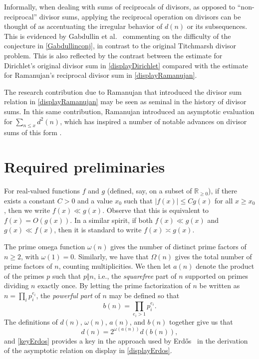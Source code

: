 \documentclass[12pt]{article}
\begin{document}
 Informally, when dealing with sums of reciprocals of divisors, as opposed to ``non-reciprocal'' divisor sums, applying the reciprocal 
 operation on divisors can be thought of as accentuating  the irregular behavior of $d(n)$ or its subsequences.  This is evidenced by 
 Gabdullin et al.\ \cite{GabdullinKonyaginIudelevich2023} commenting on the difficulty of the conjecture in  \eqref{Gabdullinconj}, in  
 contrast to the original  Titchmarsh divisor problem. 
 This is also reflected by the contrast between the estimate for Dirichlet's original divisor sum in 
 \eqref{displayDirichlet} compared with the estimate
 for Ramanujan's reciprocal divisor sum in \eqref{displayRamanujan}. 

 The research contribution due to Ramanujan \cite{Ramanujan1915analytic} that introduced the divisor sum relation in 
 \eqref{displayRamanujan} may be seen as seminal in the history of divisor sums. 
 In this same contribution, Ramanujan introduced
 an asymptotic evaluation for 
 $ \sum_{n \leq x} d^{2}(n)$, 
 which has inspired a number of notable 
 advances on divisor sums of this form \cite{CullyHugillTrudgian2021,JiaSankaranarayanan2014,MaierSankaranarayanan2005,RamachandraSankaranarayanan2003}. 

\section{Required preliminaries}\label{secprelim}
 For real-valued functions $f$ and $g$ (defined, say, on a subset of $\mathbb{R}_{\geq 0}$), if there exists a constant $C > 0$ and a value 
 $x_0$ such that $ |f(x)| \leq C g(x) $ for all $x \geq x_0$, then we write $f(x) \ll g(x)$. Observe that this is equivalent to $f(x) = O(g(x))$. 
 In a similar spirit, if both $f(x) \ll g(x)$ and $g(x) \ll f(x)$, then it is standard to write $f(x) \asymp g(x)$. 

 The prime omega function $\omega(n)$ gives the number of distinct prime factors of $n \geq 2$, with $\omega(1) = 0$. Similarly, we 
 have that $\Omega(n)$
 gives the total number of prime factors of $n$, counting multiplicities. 
 We then let \(a(n)\) denote the product of the primes \(p\) such that \(p\Vert n\), 
 i.e., the \emph{squarefree} part of \(n\) supported on primes dividing \(n\) exactly once. 
 By letting the prime factorization of $n$ be written as
 $n = \prod_{i} p_{i}^{e_i}$, the \emph{powerful part} of $n$
 may be defined so that 
\begin{equation}\label{displaybn}
 b(n) = \prod_{e_{i} >1} p_{i}^{e_{i}}. 
\end{equation} 
 The definitions of $d(n)$, $\omega(n)$, $a(n)$, and $b(n)$ together give us that 
\begin{equation}\label{keyErdos}
 d(n) = 2^{\omega(a(n))} d(b(n)), 
\end{equation}
 and \eqref{keyErdos} provides a key in the approach used by Erd\H os~\cite{Erdos1968} in the derivation of the 
 asymptotic relation on display in \eqref{displayErdos}. 
\end{document}
